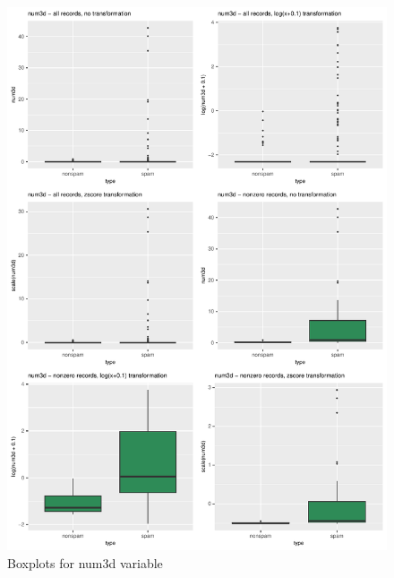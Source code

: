 \documentclass{article}\usepackage[]{graphicx}\usepackage[]{xcolor}
\makeatletter
\def\maxwidth{ %
  \ifdim\Gin@nat@width>\linewidth
    \linewidth
  \else
    \Gin@nat@width
  \fi
}
\newenvironment{knitrout}{}{} %
\makeatother
\begin{document}
\begin{knitrout}
\color{fgcolor}\begin{figure}[h]
\includegraphics[width=\maxwidth]{figure/num3dBox-1} \caption[\label{fig3} Boxplots for num3d variable]{\label{fig3} Boxplots for num3d variable}\label{fig:num3dBox}
\end{figure}

\end{knitrout}
\end{document}
